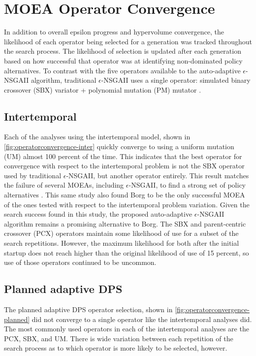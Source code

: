 \chapter{MOEA Operator Convergence}
\label{appendix-operatorconvergence}

In addition to overall epsilon progress and hypervolume convergence, the likelihood of each operator being selected for a generation was tracked throughout the search process. The likelihood of selection is updated after each generation based on how successful that operator was at identifying non-dominated policy alternatives. To contrast with the five operators available to the auto-adaptive $\epsilon$-NSGAII algorithm, traditional $\epsilon$-NSGAII uses a single operator: simulated binary crossover (SBX) variator + polynomial mutation (PM) mutator \citep{Reed2013}.

\section{Intertemporal}
Each of the analyses using the intertemporal model, shown in \cref{fig:operatorconvergence-inter} quickly converge to using a uniform mutation (UM) almost 100 percent of the time. This indicates that the best operator for convergence with respect to the intertemporal problem is not the SBX operator used by traditional $\epsilon$-NSGAII, but another operator entirely. This result matches the failure of several MOEAs, including $\epsilon$-NSGAII, to find a strong set of policy alternatives \citep{Ward2015}. This same study also found Borg to be the only successful MOEA of the ones tested with respect to the intertemporal problem variation. Given the search success found in this study, the proposed auto-adaptive $\epsilon$-NSGAII algorithm remains a promising alternative to Borg. The SBX and parent-centric crossover (PCX) operators maintain some likelihood of use for a subset of the search repetitions. However, the maximum likelihood for both after the initial startup does not reach higher than the original likelihood of use of 15 percent, so use of those operators continued to be uncommon. 

\section{Planned adaptive DPS}
The planned adaptive DPS operator selection, shown in \cref{fig:operatorconvergence-planned} did not converge to a single operator like the intertemporal analyses did. The most commonly used operators in each of the intertemporal analyses are the PCX, SBX, and UM. There is wide variation between each repetition of the search process as to which operator is more likely to be selected, however.

